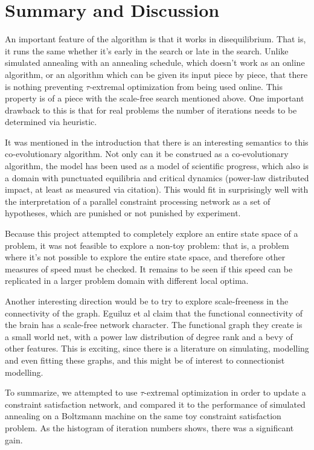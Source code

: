 \documentclass[12pt]{article}
\begin{document}
\section{Summary and Discussion}
An important feature of the algorithm is that it works in disequilibrium\cite{boettcher}. That is, it runs the same whether it's early in the search or late in the search. Unlike simulated annealing with an annealing schedule, which doesn't work as an online algorithm, or an algorithm which can be given its input piece by piece, that there is nothing preventing $\tau$-extremal optimization from being used online. This property is of a piece with the scale-free search mentioned above. One important drawback to this is that for real problems the number of iterations needs to be determined via heuristic.

It was mentioned in the introduction that there is an interesting semantics to this co-evolutionary algorithm. Not only can it be construed as a co-evolutionary algorithm, the model has been used as a model of scientific progress\cite{bakscience}, which also is a domain with punctuated equilibria and critical dynamics (power-law distributed impact, at least as measured via citation\cite{citationpowerlaw}). This would fit in surprisingly well with the interpretation of a parallel constraint processing network as a set of hypotheses, which are punished or not punished by experiment.

Because this project attempted to completely explore an entire state space of a problem, it was not feasible to explore a non-toy problem: that is, a problem where it's not possible to explore the entire state space, and therefore other measures of speed must be checked. It remains to be seen if this speed can be replicated in a larger problem domain with different local optima.

Another interesting direction would be to try to explore scale-freeness in the connectivity of the graph. Eguiluz et al\cite{funcnets} claim that the functional connectivity of the brain has a scale-free network character. The functional graph they create is a small world net\cite{smallworldnet}, with a power law distribution of degree rank and a bevy of other features. This is exciting, since there is a literature on simulating, modelling and even fitting these graphs, and this might be of interest to connectionist modelling.

To summarize, we attempted to use $\tau$-extremal optimization in order to update a constraint satisfaction network, and compared it to the performance of simulated annealing on a Boltzmann machine on the same toy constraint satisfaction problem. As the histogram of iteration numbers shows, there was a significant gain.
\end{document}
